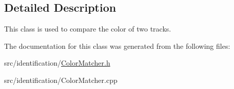 \subsection{Detailed Description}
This class is used to compare the color of two tracks. 

The documentation for this class was generated from the following files\+:\begin{DoxyCompactItemize}
\item 
src/identification/\mbox{\hyperlink{_color_matcher_8h}{Color\+Matcher.\+h}}\item 
src/identification/Color\+Matcher.\+cpp\end{DoxyCompactItemize}
